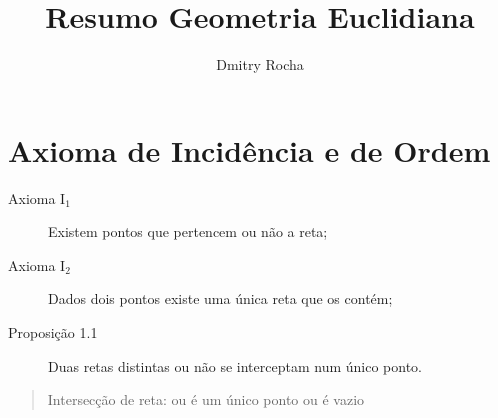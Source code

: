 \documentclass[11pt]{article}
\author{Dmitry Rocha}
\title{Resumo Geometria Euclidiana}
\begin{document}
\maketitle


\section{Axioma de Incidência e de Ordem}


\begin{description}
  \item[Axioma I$_{1}$] Existem pontos que pertencem ou não a reta;
  \item[Axioma I$_{2}$] Dados dois pontos existe uma única reta que os contém;
  \item[Proposição 1.1] Duas retas distintas ou não se interceptam num único
    ponto.
\end{description}

\begin{quote}
  Intersecção de reta: ou é um único ponto ou é vazio
\end{quote}

\end{document}
